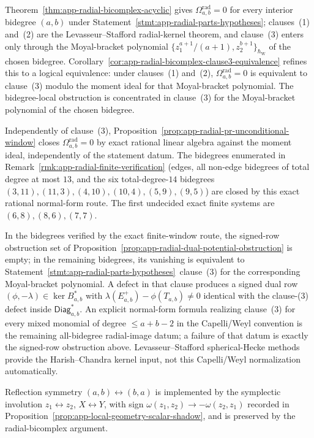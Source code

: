 \begin{rmk}
\label{rmk:app-radial-open-bidegree-boundary}
  Theorem~\ref{thm:app-radial-bicomplex-acyclic} gives
  \(\Omega^{\mathrm{rad}}_{a,b}=0\) for every interior bidegree
  \((a,b)\) under
  Statement~\ref{stmt:app-radial-parts-hypotheses}; clauses~(1)
  and~(2) are the Levasseur--Stafford radial-kernel theorem, and
  clause~(3) enters only through the Moyal-bracket polynomial
  \(\{z_1^{a+1}/(a+1),z_2^{b+1}\}_{\hbar_{\mathrm{W}}}\) of the chosen bidegree.
  Corollary~\ref{cor:app-radial-bicomplex-clause3-equivalence}
  refines this to a logical equivalence: under clauses~(1)
  and~(2), \(\Omega^{\mathrm{rad}}_{a,b}=0\) is equivalent to
  clause~(3) modulo the moment ideal for that Moyal-bracket
  polynomial.  The bidegree-local obstruction is concentrated in
  clause~(3) for the Moyal-bracket polynomial of the chosen
  bidegree.

  Independently of clause~(3),
  Proposition~\ref{prop:app-radial-pr-unconditional-window}
  closes \(\Omega^{\mathrm{rad}}_{a,b}=0\) by exact rational
  linear algebra against the moment ideal, independently of the
  statement datum.  The bidegrees enumerated in
  Remark~\ref{rmk:app-radial-finite-verification} (edges, all
  non-edge bidegrees of total degree at most \(13\), and the six
  total-degree-\(14\) bidegrees
  \((3,11),(11,3),(4,10),(10,4),(5,9),(9,5)\)) are closed by this
  exact rational normal-form route.  The first undecided exact
  finite systems are \((6,8),(8,6),(7,7)\).

  In the bidegrees verified by the exact finite-window route, the
  signed-row obstruction set of
  Proposition~\ref{prop:app-radial-dual-potential-obstruction}
  is empty; in the remaining bidegrees, its vanishing is
  equivalent to
  Statement~\ref{stmt:app-radial-parts-hypotheses}~clause~(3) for
  the corresponding Moyal-bracket polynomial.  A defect in that
  clause produces a signed dual row
  \((\phi,-\lambda)\in\ker B_{a,b}^*\) with
  \(\lambda(E^+_{a,b})-\phi(T_{a,b})\neq0\) identical with the
  clause-(3) defect inside \(\mathsf{Diag}_{a,b}^{*}\).  An explicit
  normal-form formula realizing clause~(3) for every mixed monomial of
  degree \(\leq a+b-2\) in the Capelli/Weyl convention is the remaining
  all-bidegree radial-image datum; a failure of that datum is exactly
  the signed-row obstruction above.  Levasseur--Stafford spherical-Hecke
  methods provide the Harish--Chandra kernel input, not this
  Capelli/Weyl normalization automatically.

  Reflection symmetry \((a,b)\leftrightarrow(b,a)\) is implemented
  by the symplectic involution \(z_1\leftrightarrow z_2\),
  \(X\leftrightarrow Y\), with sign
  \(\omega(z_1,z_2)\to-\omega(z_2,z_1)\) recorded in
  Proposition~\ref{prop:app-local-geometry-scalar-shadow}, and is
  preserved by the radial-bicomplex argument.
\end{rmk}
